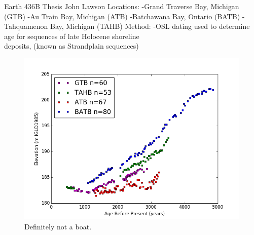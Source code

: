 \documentclass{article}
\begin{document}
Earth 436B Thesis
John Lawson
\newpage
Locations:
-Grand Traverse Bay, Michigan (GTB)
-Au Train Bay, Michigan (ATB)
-Batchawana Bay, Ontario (BATB)
-Tahquamenon Bay, Michigan (TAHB)
\newpage
Method:
-OSL dating used to determine age for sequences of late Holocene shoreline\\ 
deposits, (known as Strandplain sequences) 

\newpage
\begin{figure}
	\includegraphics[width=\linewidth]{data/theDataRaw.png}
	\caption{Definitely not a boat.}
	\label{fig:notAboat1}
\end{figure}
\end{document}
